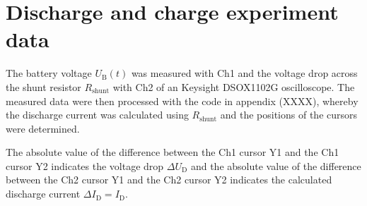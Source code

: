 \chapter{Discharge and charge experiment data} \label{appendix_1_discharge_and_charge_experiment_data}

The battery voltage $U_\mathrm{B}(t)$ was measured with Ch1 and the voltage drop across the shunt resistor $R_\mathrm{shunt}$ with Ch2 of an Keysight DSOX1102G oscilloscope. The measured  data were then processed with the \MATLAB code in appendix (XXXX), whereby the discharge current was calculated using $R_\mathrm{shunt}$ and the positions of the cursors were determined.

The absolute value of the difference between the Ch1 cursor Y1 and the Ch1 cursor Y2 indicates the voltage drop $\Delta U_\mathrm{D}$ and the absolute value of the difference between the Ch2 cursor Y1 and the Ch2 cursor Y2 indicates the calculated discharge current $\Delta I_\mathrm{D}= I_\mathrm{D}$. 
